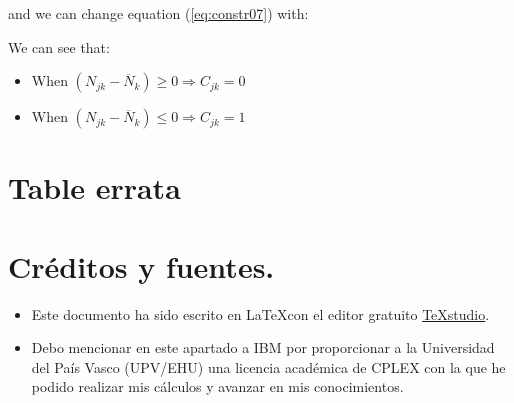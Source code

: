 \documentclass[a4paper,12pt]{article}
\begin{document}
and we can change equation (\ref{eq:constr07}) with:
\begin{lpformulation}
\end{lpformulation}
We can see that:
\begin{itemize}
	\item When $(N_{jk} - \overline{N}_k) \ge 0 \Longrightarrow C_{jk} = 0$
	\item When $(N_{jk} - \overline{N}_k) \le 0 \Longrightarrow C_{jk} = 1$
\end{itemize}


\section{Table errata}

	
\section{Créditos y fuentes.}
	
	\begin{itemize}
		\item Este documento ha sido escrito en \LaTeX con el editor gratuito  \href{https://www.texstudio.org/}{TeXstudio}.
		\item Debo mencionar en este apartado a IBM por proporcionar a la Universidad del País Vasco (UPV/EHU) una licencia académica de CPLEX \texttrademark con la que he podido realizar mis cálculos y avanzar en mis conocimientos.
	\end{itemize}
	
	
	
	
	
\end{document}
